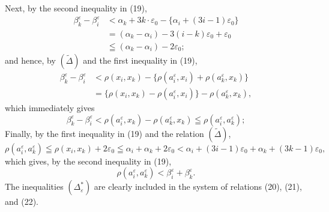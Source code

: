 \documentclass[a4paper,12pt]{amsart}
\newcommand{\srcpage}[1]{} %
\begin{document}
\srcpage{60}
Next, by the second inequality in (19),
\[
\begin{aligned}
\beta_k^\varepsilon-\beta_i^\varepsilon
&<\alpha_k+3k\cdot\varepsilon_0-\{\alpha_i+(3i-1)\varepsilon_0\}\\
&=(\alpha_k-\alpha_i)-3(i-k)\varepsilon_0+\varepsilon_0\\
&\leqq(\alpha_k-\alpha_i)-2\varepsilon_0;
\end{aligned}
\]
and hence, by $(\widetilde{\Delta})$ and the first inequality in (19),
\[
\begin{aligned}
\beta_k^\varepsilon-\beta_i^\varepsilon
&<\rho(x_i,x_k)-\{\rho(a_i^\varepsilon,x_i)+\rho(a_k^\varepsilon,x_k)\}\\
&=\{\rho(x_i,x_k)-\rho(a_i^\varepsilon,x_i)\}-\rho(a_k^\varepsilon,x_k),
\end{aligned}
\]
which immediately gives
\begin{equation}\tag{21}
\beta_k^\varepsilon-\beta_i^\varepsilon
<\rho(a_i^\varepsilon,x_k)-\rho(a_k^\varepsilon,x_k)
\leqq\rho(a_i^\varepsilon,a_k^\varepsilon);
\end{equation}
Finally, by the first inequality in (19) and the relation $(\widetilde{\Delta})$,
{\small
\[
\rho(a_i^\varepsilon,a_k^\varepsilon)\leqq\rho(x_i,x_k)+2\varepsilon_0
\leqq\alpha_i+\alpha_k+2\varepsilon_0
<\alpha_i+(3i-1)\varepsilon_0+\alpha_k+(3k-1)\varepsilon_0,
\]
}
which gives, by the second inequality in (19),
\begin{equation}\tag{22}
\rho(a_i^\varepsilon,a_k^\varepsilon)<\beta_i^\varepsilon+\beta_k^\varepsilon.
\end{equation}
The inequalities $(\Delta^*_\varepsilon)$ are clearly included in the system of relations (20), (21), and (22).
\end{document}
